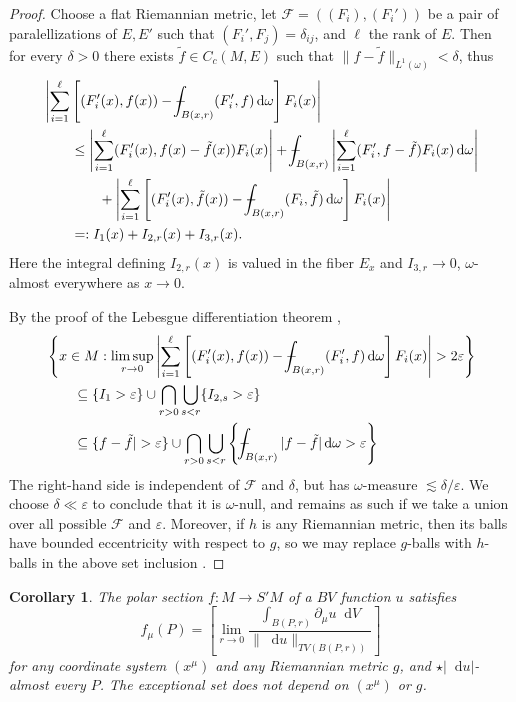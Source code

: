 \documentclass[reqno,11pt]{amsart}
\newcommand*\dif{\mathop{}\!\mathrm{d}}
\newtheorem{corollary}[theorem]{Corollary}
\theoremstyle{definition}
\numberwithin{equation}{section}
\def\Xint#1{\mathchoice
{\XXint\displaystyle\textstyle{#1}}%
{\XXint\textstyle\scriptstyle{#1}}%
{\XXint\scriptstyle\scriptscriptstyle{#1}}%
{\XXint\scriptscriptstyle\scriptscriptstyle{#1}}%
\!\int}
\def\XXint#1#2#3{{\setbox0=\hbox{$#1{#2#3}{\int}$ }
\vcenter{\hbox{$#2#3$ }}\kern-.6\wd0}}
\def\dashint{\Xint-}
\begin{document}
\begin{proof}
Choose a flat Riemannian metric, let $\mathcal F = ((F_i), (F_i'))$ be a pair of paralellizations of $E, E'$ such that $(F_i', F_j) = \delta_{ij}$, and $\ell$ the rank of $E$.
Then for every $\delta > 0$ there exists $\tilde f \in C_c(M, E)$ such that $\|f - \tilde f\|_{L^1(\omega)} < \delta$, thus
\begin{align*}
&\left|\sum_{i=1}^\ell \left[(F_i'(x), f(x)) - \dashint_{B(x, r)} (F_i', f) \dif \omega\right] F_i(x)\right| \\
&\qquad \leq \left|\sum_{i=1}^\ell (F_i'(x), f(x) - \tilde f(x)) F_i(x)\right| + \dashint_{B(x, r)} \left|\sum_{i=1}^\ell (F_i', f - \tilde f)F_i(x) \dif \omega \right| \\
&\qquad \qquad + \left|\sum_{i=1}^\ell \left[(F_i'(x), \tilde f(x)) - \dashint_{B(x, r)} (F_i, \tilde f) \dif \omega\right] F_i(x)\right| \\
&\qquad =: I_1(x) + I_{2, r}(x) + I_{3, r}(x).
\end{align*}
Here the integral defining $I_{2, r}(x)$ is valued in the fiber $E_x$ and $I_{3, r} \to 0$, $\omega$-almost everywhere as $x \to 0$.

By the proof of the Lebesgue differentiation theorem \cite[Chapter 3, Theorem 1.3]{stein2009real},
\begin{align*}
&\left\{x \in M: \limsup_{r \to 0} \left|\sum_{i=1}^\ell \left[(F_i'(x), f(x)) - \dashint_{B(x, r)} (F_i', f) \dif \omega\right] F_i(x)\right| > 2\varepsilon\right\} \\
&\qquad \subseteq \{I_1 > \varepsilon\} \cup \bigcap_{r > 0} \bigcup_{s <r} \{I_{2, s} > \varepsilon\} \\
&\qquad \subseteq \{f - \tilde f| > \varepsilon\} \cup \bigcap_{r > 0} \bigcup_{s < r} \left\{\dashint_{B(x, r)} |f - \tilde f| \dif \omega > \varepsilon\right\}
\end{align*}
The right-hand side is independent of $\mathcal F$ and $\delta$, but has $\omega$-measure $\lesssim \delta/\varepsilon$.
We choose $\delta \ll \varepsilon$ to conclude that it is $\omega$-null, and remains as such if we take a union over all possible $\mathcal F$ and $\varepsilon$.
Moreover, if $h$ is any Riemannian metric, then its balls have bounded eccentricity with respect to $g$, so we may replace $g$-balls with $h$-balls in the above set inclusion \cite[Chapter 3, Corollary 1.7]{stein2009real}.
\end{proof}

\begin{corollary}
The polar section $f: M \to S'M$ of a $BV$ function $u$ satisfies
\begin{equation}\label{Lebesgue point definition}
    f_\mu(P) = \left[\lim_{r \to 0} \frac{\int_{B(P, r)} \partial_\mu u \dif V}{\|\dif u\|_{TV(B(P, r))}}\right]
\end{equation}
for any coordinate system $(x^\mu)$ and any Riemannian metric $g$, and $\star|\dif u|$-almost every $P$.
The exceptional set does not depend on $(x^\mu)$ or $g$.
\end{corollary}
\end{document}
